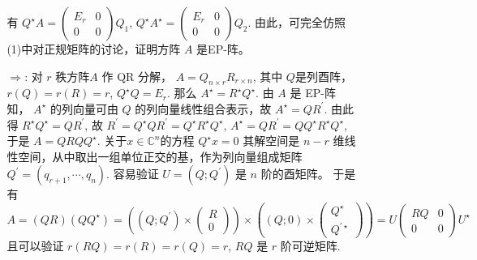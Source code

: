 \documentclass{article}
\begin{document}
\begin{spacing}{1.5}
\begin{enumerate}
\begin{itemize}
\begin{enumerate}
                有 $Q^\star A = \left(\begin{array}{cc}E_r&0\\0&0\end{array}\right)Q_1$, 
                                    $Q^\star A^\star = \left(\begin{array}{cc}E_r&0\\0&0\end{array}\right)Q_2$.
                由此，可完全仿照(1)中对正规矩阵的讨论，证明方阵 $A$ 是EP-阵。
                \item [$\Rightarrow$:] 对 $r$ 秩方阵$A$ 作 QR 分解， $A = Q_{n\times r}R_{r\times n}$, 其中 $Q$是列酉阵，$r(Q) = r(R) = r$, $Q^\star Q = E_r$.
                那么 $A^\star = R^\star Q^\star$. 由 $A$ 是 EP-阵知， $A^\star$ 的列向量可由 $Q$ 的列向量线性组合表示，故 $A^\star = QR^\prime$.
                由此得 $R^\star Q^\star = QR^\prime$, 故 $R^\prime = Q^\star QR^\prime = Q^\star R^\star Q^\star$, $A^\star = QR^\prime = QQ^\star R^\star Q^\star$, 于是 $A = QRQQ^\star$.
                关于$x\in\mathbb{C}^n$的方程 $Q^\star x = 0$ 其解空间是 $n-r$ 维线性空间，从中取出一组单位正交的基，作为列向量组成矩阵 $Q^\prime = (q_{r+1}, \cdots, q_n)$. 容易验证 $U = (Q; Q^\prime)$ 是 $n$ 阶的酉矩阵。
                于是有 $$A = (QR)(QQ^\star) = \left(\left(Q; Q^\prime\right)\times\left(\begin{array}{c}R\\0\end{array}\right)\right)\times\left(\left(Q;0\right)\times\left(\begin{array}{c}Q^\star\\Q^{\prime\star}\end{array}\right)\right) = U\left(\begin{array}{cc}RQ&0\\0&0\end{array}\right)U^\star$$
                且可以验证 $r(RQ) = r(R) = r(Q) = r$, $RQ$ 是 $r$ 阶可逆矩阵.
            \end{enumerate}
        \end{itemize}


\end{enumerate}
\end{spacing}
\end{document}

